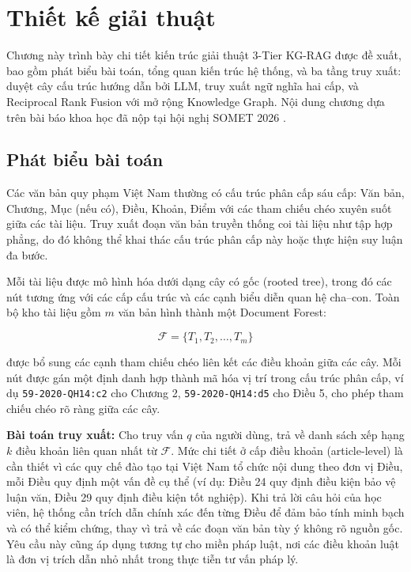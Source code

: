\chapter{Thiết kế giải thuật}
\label{chap:thiet-ke-giai-thuat}

Chương này trình bày chi tiết kiến trúc giải thuật 3-Tier KG-RAG được đề xuất,
bao gồm phát biểu bài toán, tổng quan kiến trúc hệ thống, và ba tầng truy xuất:
duyệt cây cấu trúc hướng dẫn bởi LLM, truy xuất ngữ nghĩa hai cấp, và
Reciprocal Rank Fusion với mở rộng Knowledge Graph. Nội dung chương dựa trên
bài báo khoa học đã nộp tại hội nghị SOMET 2026 \cite{le2026threetier}.

\section{Phát biểu bài toán}
\label{sec:phat-bieu-bai-toan}

Các văn bản quy phạm Việt Nam thường có cấu trúc phân cấp sáu cấp: Văn bản,
Chương, Mục (nếu có), Điều, Khoản, Điểm với các tham chiếu chéo xuyên suốt giữa
các tài liệu. Truy xuất đoạn văn bản truyền thống coi tài liệu như tập hợp phẳng,
do đó không thể khai thác cấu trúc phân cấp này hoặc thực hiện suy luận đa bước.

Mỗi tài liệu được mô hình hóa dưới dạng cây có gốc (rooted tree), trong đó các
nút tương ứng với các cấp cấu trúc và các cạnh biểu diễn quan hệ cha--con. Toàn
bộ kho tài liệu gồm $m$ văn bản hình thành một Document Forest:

\begin{equation}
  \mathcal{F} = \{T_1, T_2, \ldots, T_m\}
  \label{eq:document-forest}
\end{equation}

\noindent được bổ sung các cạnh tham chiếu chéo liên kết các điều khoản giữa các
cây. Mỗi nút được gán một định danh hợp thành mã hóa vị trí trong cấu trúc phân
cấp, ví dụ \texttt{59-2020-QH14:c2} cho Chương 2, \texttt{59-2020-QH14:d5} cho
Điều 5, cho phép tham chiếu chéo rõ ràng giữa các cây.

\textbf{Bài toán truy xuất:} Cho truy vấn $q$ của người dùng, trả về danh sách
xếp hạng $k$ điều khoản liên quan nhất từ $\mathcal{F}$. Mức chi tiết ở cấp điều
khoản (article-level) là cần thiết vì các quy chế đào tạo tại Việt Nam tổ chức
nội dung theo đơn vị Điều, mỗi Điều quy định một vấn đề cụ thể (ví dụ: Điều 24
quy định điều kiện bảo vệ luận văn, Điều 29 quy định điều kiện tốt nghiệp). Khi
trả lời câu hỏi của học viên, hệ thống cần trích dẫn chính xác đến từng Điều để
đảm bảo tính minh bạch và có thể kiểm chứng, thay vì trả về các đoạn văn bản tùy
ý không rõ nguồn gốc. Yêu cầu này cũng áp dụng tương tự cho miền pháp luật, nơi
các điều khoản luật là đơn vị trích dẫn nhỏ nhất trong thực tiễn tư vấn pháp lý.

